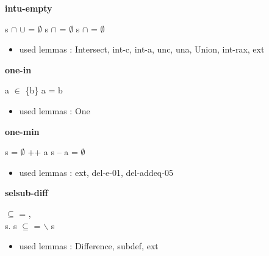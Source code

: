 \documentclass[a4paper]{article}
\begin{document}
\medskip

\bigskip

{\large\bf intu-empty}

\medskip

 \Fol s $\cap$  $\cup$  = $\emptyset$ \Equiv s $\cap$  = $\emptyset$ \And s $\cap$  = $\emptyset$

\begin{itemize}


\item       used lemmas  : Intersect, int-c, int-a, unc, una, Union, int-rax, ext

\end{itemize}

\medskip

\bigskip

{\large\bf one-in}

\medskip

 \Fol a $\in$ \{b\} \Equiv a = b

\begin{itemize}


\item       used lemmas  : One

\end{itemize}

\medskip

\bigskip

{\large\bf one-min}

\medskip

 \Fol s = $\emptyset$ ++ a \Imp s -- a = $\emptyset$

\begin{itemize}


\item       used lemmas  : ext, del-e-01, del-addeq-05

\end{itemize}

\medskip

\bigskip

{\large\bf selsub-diff}

\medskip

 $\subseteq$  \Fol {} = , \\
\Ex s. s $\subseteq$  \And {} =  $\backslash$ s

\begin{itemize}


\item       used lemmas  : Difference, subdef, ext

\end{itemize}
\end{document}
